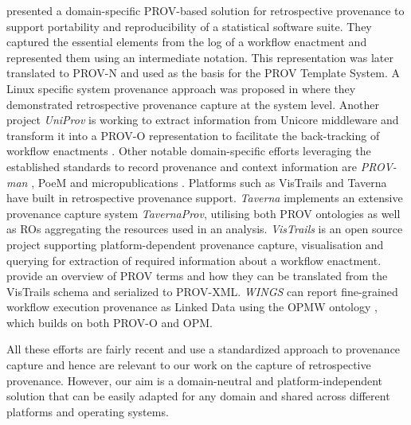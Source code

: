 \documentclass[a4paper,num-refs]{oup-contemporary}
\begin{document}
\citet{michaelides_2016} presented a domain-specific PROV-based solution for retrospective provenance to support portability and reproducibility of a statistical software suite. They captured the essential elements from the log of a workflow enactment and represented them using an intermediate notation. This representation was later translated to PROV-N and used as the basis for the PROV Template System. A Linux specific system provenance approach was proposed in \citep{pasquier_2017} where they demonstrated retrospective provenance capture at the system level. Another project \textit{UniProv} is working to extract information from Unicore middleware and transform it into a PROV-O representation to facilitate the back-tracking of workflow enactments \citep{giesler_2017}. Other notable domain-specific efforts leveraging the established standards to record provenance and context information are \textit{PROV-man} \citep{benabdelkader_2015}, PoeM \citep{PoeM} and micropublications \citep{Clark2014}. Platforms such as VisTrails  and Taverna have built in retrospective provenance support. \textit{Taverna}  \citep{wolstencroft_2013}  implements an extensive provenance capture system \textit{TavernaProv}\citep{tavernaprov}, utilising both PROV ontologies as well as ROs aggregating the resources used in an analysis. \textit{VisTrails}\citep{freire_2012} is an open source project supporting platform-dependent provenance capture, visualisation and querying for extraction of required information about a workflow enactment. \citep{Chirigati2016} provide an overview of PROV terms and how they can be translated from the VisTrails schema and serialized to PROV-XML.  \textit{WINGS}\citep{wings2011} can report fine-grained workflow execution provenance as Linked Data using the OPMW ontology \citep{garijo_2017}, which builds on both PROV-O and OPM.

All these efforts are fairly recent and use a standardized approach to provenance capture and hence are relevant to our work on the capture of retrospective provenance. However, our aim is a domain-neutral and platform-independent solution that can be easily adapted for any domain and shared across different platforms and operating systems.
\end{document}
